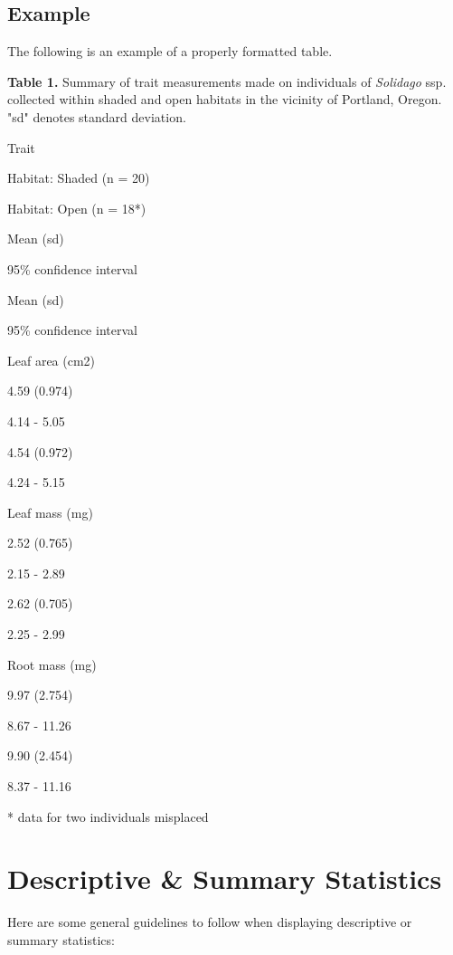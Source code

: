 \documentclass[
]{book}
\begin{document}
\subsection*{Example}\label{example}

The following is an example of a properly formatted table.

\textbf{Table 1.} Summary of trait measurements made on individuals of \emph{Solidago} ssp. collected within shaded and open habitats in the vicinity of Portland, Oregon. "sd" denotes standard deviation.

Trait

Habitat: Shaded (n = 20)

Habitat: Open (n = 18*)

Mean (sd)

95\% confidence interval

Mean (sd)

95\% confidence interval

Leaf area (cm2)

4.59 (0.974)

4.14 - 5.05

4.54 (0.972)

4.24 - 5.15

Leaf mass (mg)

2.52 (0.765)

2.15 - 2.89

2.62 (0.705)

2.25 - 2.99

Root mass (mg)

9.97 (2.754)

8.67 - 11.26

9.90 (2.454)

8.37 - 11.16

* data for two individuals misplaced

\section{Descriptive \& Summary Statistics}\label{descriptive-summary-statistics}

Here are some general guidelines to follow when displaying descriptive or summary statistics:
\end{document}
